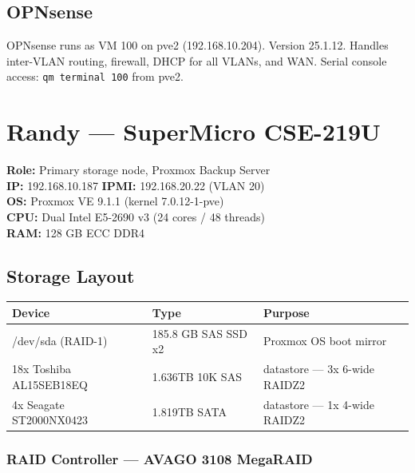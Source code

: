 \documentclass[11pt,letterpaper]{article}
\begin{document}
\subsection{OPNsense}

OPNsense runs as VM 100 on pve2 (192.168.10.204). Version 25.1.12.
Handles inter-VLAN routing, firewall, DHCP for all VLANs, and WAN.
Serial console access: \texttt{qm terminal 100} from pve2.

\section{Randy — SuperMicro CSE-219U}
\label{sec:randy}

\begin{infobox}
\textbf{Role:} Primary storage node, Proxmox Backup Server \\
\textbf{IP:} 192.168.10.187 \quad \textbf{IPMI:} 192.168.20.22 (VLAN 20) \\
\textbf{OS:} Proxmox VE 9.1.1 (kernel 7.0.12-1-pve) \\
\textbf{CPU:} Dual Intel E5-2690 v3 (24 cores / 48 threads) \\
\textbf{RAM:} 128 GB ECC DDR4
\end{infobox}

\subsection{Storage Layout}

\begin{tabular}{lll}
\toprule
\textbf{Device} & \textbf{Type} & \textbf{Purpose} \\
\midrule
/dev/sda (RAID-1) & 185.8 GB SAS SSD x2 & Proxmox OS boot mirror \\
18x Toshiba AL15SEB18EQ & 1.636TB 10K SAS & datastore — 3x 6-wide RAIDZ2 \\
4x Seagate ST2000NX0423 & 1.819TB SATA & datastore — 1x 4-wide RAIDZ2 \\
\bottomrule
\end{tabular}

\subsubsection{RAID Controller — AVAGO 3108 MegaRAID}
\end{document}
